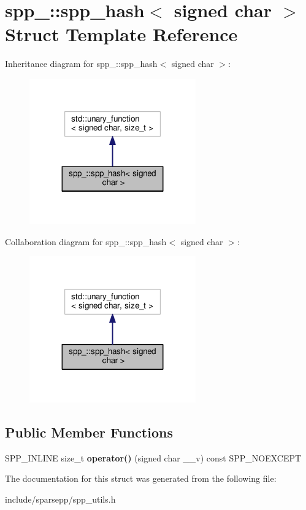 \hypertarget{structspp___1_1spp__hash_3_01signed_01char_01_4}{}\section{spp\+\_\+\+:\+:spp\+\_\+hash$<$ signed char $>$ Struct Template Reference}
\label{structspp___1_1spp__hash_3_01signed_01char_01_4}


Inheritance diagram for spp\+\_\+\+:\+:spp\+\_\+hash$<$ signed char $>$\+:\nopagebreak
\begin{figure}[H]
\begin{center}
\leavevmode
\includegraphics[width=203pt]{structspp___1_1spp__hash_3_01signed_01char_01_4__inherit__graph}
\end{center}
\end{figure}


Collaboration diagram for spp\+\_\+\+:\+:spp\+\_\+hash$<$ signed char $>$\+:\nopagebreak
\begin{figure}[H]
\begin{center}
\leavevmode
\includegraphics[width=203pt]{structspp___1_1spp__hash_3_01signed_01char_01_4__coll__graph}
\end{center}
\end{figure}
\subsection*{Public Member Functions}
\begin{DoxyCompactItemize}
\item 
S\+P\+P\+\_\+\+I\+N\+L\+I\+NE size\+\_\+t {\bfseries operator()} (signed char \+\_\+\+\_\+v) const S\+P\+P\+\_\+\+N\+O\+E\+X\+C\+E\+PT\hypertarget{structspp___1_1spp__hash_3_01signed_01char_01_4_a1a1fa5c5725648ebde5a175bbd39830f}{}\label{structspp___1_1spp__hash_3_01signed_01char_01_4_a1a1fa5c5725648ebde5a175bbd39830f}

\end{DoxyCompactItemize}


The documentation for this struct was generated from the following file\+:\begin{DoxyCompactItemize}
\item 
include/sparsepp/spp\+\_\+utils.\+h\end{DoxyCompactItemize}
